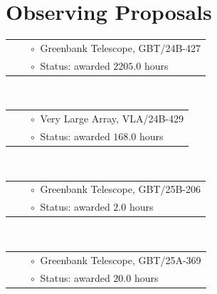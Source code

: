 \documentclass[11pt,letterpaper,sans,unicode]{moderncv}
\begin{document}
\section{Observing Proposals}
{\small
{}
\begin{tabular}{rcl}
&\hspace{0.4cm} &{\color{color1} $\circ\;\;$}Greenbank Telescope, GBT/24B-427  \\
&\hspace{0.4cm} &{\color{color1} $\circ\;\;$}Status: awarded $2205.0$ hours
\end{tabular} \\

\begin{tabular}{rcl}
&\hspace{0.4cm} &{\color{color1} $\circ\;\;$}Very Large Array, VLA/24B-429  \\
&\hspace{0.4cm} &{\color{color1} $\circ\;\;$}Status: awarded $168.0$ hours
\end{tabular} \\

\begin{tabular}{rcl}
&\hspace{0.4cm} &{\color{color1} $\circ\;\;$}Greenbank Telescope, GBT/25B-206 \\
&\hspace{0.4cm} &{\color{color1} $\circ\;\;$}Status: awarded $2.0$ hours
\end{tabular} \\

\begin{tabular}{rcl}
&\hspace{0.4cm} &{\color{color1} $\circ\;\;$}Greenbank Telescope, GBT/25A-369 \\
&\hspace{0.4cm} &{\color{color1} $\circ\;\;$}Status: awarded $20.0$ hours
\end{tabular} \\


}
\end{document}
